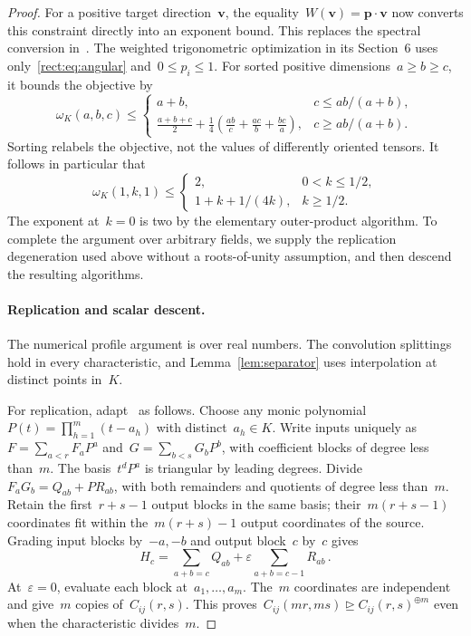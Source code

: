 \documentclass[11pt,letterpaper]{article}
\theoremstyle{definition}
\numberwithin{equation}{section}
\newcommand{\degen}{\unrhd}
\begin{document}
\begin{proof}
For a positive target direction~$\mathbf v$, the equality~$W(\mathbf v)=\mathbf p\cdot\mathbf v$ now converts this constraint directly into an exponent bound. This replaces the spectral conversion in~\cite[Lemma 6.1]{Uznanski26}. The weighted trigonometric optimization in its Section~6 uses only~\eqref{rect:eq:angular} and~$0\leq p_i\leq1$. For sorted positive dimensions~$a\geq b\geq c$, it bounds the objective by
\begin{equation}\label{rect:eq:general-shape}
 \omega_K(a,b,c)\leq
 \begin{cases}
 a+b,&c\leq ab/(a+b),\\[2pt]
 \displaystyle\frac{a+b+c}{2}
 +\frac14\left(\frac{ab}{c}+\frac{ac}{b}+\frac{bc}{a}\right),&c\geq ab/(a+b).
 \end{cases}
\end{equation}
Sorting relabels the objective, not the values of differently oriented tensors. It follows in particular that
\begin{equation}\label{rect:eq:curve-K}
 \omega_K(1,k,1)\leq
 \begin{cases}
 2,&0<k\leq1/2,\\
 1+k+1/(4k),&k\geq1/2.
 \end{cases}
\end{equation}
The exponent at~$k=0$ is two by the elementary outer-product algorithm. To complete the argument over arbitrary fields, we supply the replication degeneration used above without a roots-of-unity assumption, and then descend the resulting algorithms.

\paragraph{Replication and scalar descent.}
The numerical profile argument is over real numbers. The convolution splittings hold in every characteristic, and Lemma~\ref{lem:separator} uses interpolation at distinct points in~$K$.

For replication, adapt~\cite[Lemma 2.2 and Appendix E]{Uznanski26} as follows. Choose any monic polynomial~$P(t)=\prod_{h=1}^m(t-a_h)$ with distinct~$a_h\in K$. Write inputs uniquely as~$F=\sum_{a<r}F_aP^a$ and~$G=\sum_{b<s}G_bP^b$, with coefficient blocks of degree less than~$m$. The basis~$t^dP^a$ is triangular by leading degrees. Divide~$F_aG_b=Q_{ab}+PR_{ab}$, with both remainders and quotients of degree less than~$m$. Retain the first~$r+s-1$ output blocks in the same basis; their~$m(r+s-1)$ coordinates fit within the~$m(r+s)-1$ output coordinates of the source. Grading input blocks by~$-a,-b$ and output block~$c$ by~$c$ gives
\begin{equation*}
 H_c=\sum_{a+b=c}Q_{ab}+\varepsilon\sum_{a+b=c-1}R_{ab}\,.
\end{equation*}
At~$\varepsilon=0$, evaluate each block at~$a_1,\ldots,a_m$. The~$m$ coordinates are independent and give~$m$ copies of~$C_{ij}(r,s)$. This proves~$C_{ij}(mr,ms)\degen C_{ij}(r,s)^{\oplus m}$ even when the characteristic divides~$m$.


\end{proof}
\end{document}

